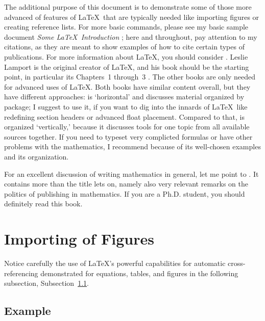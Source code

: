 \documentclass[12pt]{article}
\numberwithin{equation}{section}
\numberwithin{table}{section}
\numberwithin{figure}{section}
\begin{document}
The additional purpose of this document is to demonstrate some of
those more advanced of features of \LaTeX\ that are typically needed
like importing figures or creating reference lists. For more basic
commands, please see my basic sample document \emph{Some \LaTeX\ Introduction}
\cite{homepage}; here and throughout, pay attention to my citations,
as they are meant to show examples of how to cite certain types of
publications. For more information about \LaTeX, you should consider
\cite{Goossens94,Graetzer1996,Lamport94}.
Leslie Lamport is the original creator of \LaTeX,
and his book \cite{Lamport94}
should be the starting point, in particular its Chapters~1 through~3
\cite[Chapters~1--3]{Lamport94}.
The other books \cite{Goossens94,Graetzer1996}
are only needed for advanced uses of \LaTeX.
Both books have similar content overall,
but they have different approaches: \cite{Goossens94} is `horizontal'
and discusses material organized by package; I suggest to use it,
if you want to dig into the innards
of \LaTeX\ like redefining section headers or advanced float placement.
Compared to that, \cite{Graetzer1996} is organized `vertically,'
because it discusses tools for one topic from all available sources together.
If you need to typeset very complicted formulas or have other problems
with the mathematics, I recommend \cite{Graetzer1996} because of its
well-chosen examples and its organization.

For an excellent discussion of writing mathematics in general, let me point
to \cite{Higham98}. It contains more than the title lets on, namely
also very relevant remarks on the politics of publishing in
mathematics. If you are a Ph.D. student, you should definitely
read this book.

\section{Importing of Figures} \label{sec:import}

Notice carefully the use of \LaTeX's powerful capabilities for automatic
cross-referencing demonstrated
for equations, tables, and figures
in the following subsection,
Subsection~\ref{subsec:example}.

\subsection{Example} \label{subsec:example}
\end{document}
